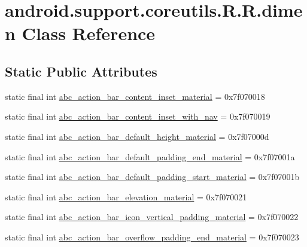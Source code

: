 \hypertarget{classandroid_1_1support_1_1coreutils_1_1_r_1_1dimen}{
\section{android.support.coreutils.R.R.dimen Class Reference}
\label{classandroid_1_1support_1_1coreutils_1_1_r_1_1dimen}
}
\subsection*{Static Public Attributes}
\begin{CompactItemize}
\item 
static final int \hyperlink{classandroid_1_1support_1_1coreutils_1_1_r_1_1dimen_dc6f9dae376e43bcc0ab6e111350042e}{abc\_\-action\_\-bar\_\-content\_\-inset\_\-material} = 0x7f070018
\item 
static final int \hyperlink{classandroid_1_1support_1_1coreutils_1_1_r_1_1dimen_4124de65ab5dda2b0a38de5bbe374357}{abc\_\-action\_\-bar\_\-content\_\-inset\_\-with\_\-nav} = 0x7f070019
\item 
static final int \hyperlink{classandroid_1_1support_1_1coreutils_1_1_r_1_1dimen_d4f11a2d1611cc8503510b3fb65a0454}{abc\_\-action\_\-bar\_\-default\_\-height\_\-material} = 0x7f07000d
\item 
static final int \hyperlink{classandroid_1_1support_1_1coreutils_1_1_r_1_1dimen_18d34b2bb9f0a0b1d4121483efec783a}{abc\_\-action\_\-bar\_\-default\_\-padding\_\-end\_\-material} = 0x7f07001a
\item 
static final int \hyperlink{classandroid_1_1support_1_1coreutils_1_1_r_1_1dimen_f5f2fb44d9f0f7c4af8a90d0ef5b1191}{abc\_\-action\_\-bar\_\-default\_\-padding\_\-start\_\-material} = 0x7f07001b
\item 
static final int \hyperlink{classandroid_1_1support_1_1coreutils_1_1_r_1_1dimen_f8701866fd55719a63f408514618c8d6}{abc\_\-action\_\-bar\_\-elevation\_\-material} = 0x7f070021
\item 
static final int \hyperlink{classandroid_1_1support_1_1coreutils_1_1_r_1_1dimen_679046c481c4774415edf475182a8384}{abc\_\-action\_\-bar\_\-icon\_\-vertical\_\-padding\_\-material} = 0x7f070022
\item 
static final int \hyperlink{classandroid_1_1support_1_1coreutils_1_1_r_1_1dimen_e9eafb1ad9843cec578c0bb59250bc00}{abc\_\-action\_\-bar\_\-overflow\_\-padding\_\-end\_\-material} = 0x7f070023
\item 

\end{CompactItemize}
